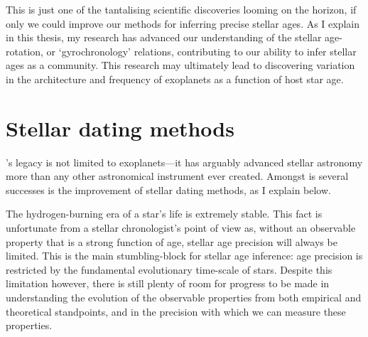 This is just one of the tantalising scientific discoveries looming on the
horizon, if only we could improve our methods for inferring precise stellar
ages.
As I explain in this thesis, my research has advanced our understanding of the
stellar age-rotation, or `gyrochronology' relations, contributing to our
ability to infer stellar ages as a community.
This research may ultimately lead to discovering variation in the architecture
and frequency of exoplanets as a function of host star age.


\section{Stellar dating methods}

\kepler's legacy is not limited to exoplanets---it has arguably advanced
stellar astronomy more than any other astronomical instrument ever created.
Amongst is several successes is the improvement of stellar dating methods, as
I explain below.

The hydrogen-burning era of a star's life is extremely stable.
This fact is unfortunate from a stellar chronologist's point of view as,
without an observable property that is a strong function of age, stellar age
precision will always be limited.
This is the main stumbling-block for stellar age inference: age precision is
restricted by the fundamental evolutionary time-scale of stars.
Despite this limitation however, there is still plenty of room for progress to
be made in understanding the evolution of the observable properties from both
empirical and theoretical standpoints, and in the precision with which we can
measure these properties.

